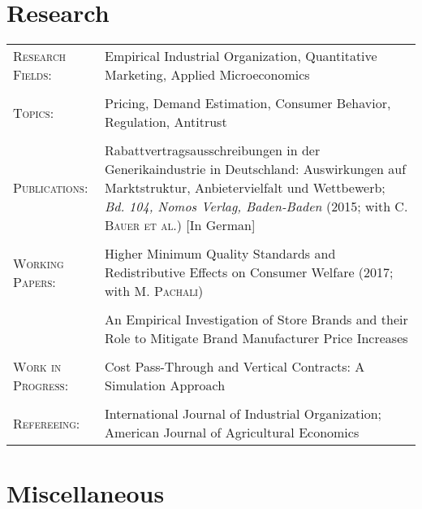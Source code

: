 \documentclass[a4paper,10pt]{article} %
\begin{document}

\section{Research}

\begin{tabular}{P{4.5cm} P{10cm}}
\textsc{Research Fields:} &  Empirical Industrial Organization, Quantitative Marketing, Applied Microeconomics \\
\\
\textsc{Topics:} &  Pricing, Demand Estimation, Consumer Behavior, Regulation, Antitrust \\
\\
\textsc{Publications:} &  Rabattvertragsausschreibungen in der Generikaindustrie in Deutschland: Auswirkungen auf Marktstruktur, Anbietervielfalt und Wettbewerb; \textit{Bd. 104, Nomos Verlag, Baden-Baden} (2015; with C. \textsc{Bauer et al.}) [In German] \\
\\
\textsc{Working Papers:} & Higher Minimum Quality Standards and Redistributive Effects on Consumer Welfare (2017; with M. \textsc{Pachali}) \\
\\
&An Empirical Investigation of Store Brands and their Role to Mitigate Brand Manufacturer Price Increases \\
\\
\textsc{Work in Progress:}  & Cost Pass-Through and Vertical Contracts: A Simulation Approach \\
\\
\textsc{Refereeing:}  & International Journal of Industrial Organization; American Journal of Agricultural Economics \\
\end{tabular}





\section{Miscellaneous}
\end{document}
